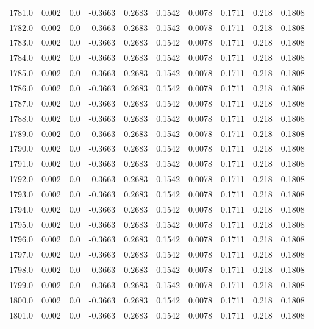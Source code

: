 \begin{longtable}{lrrrrrrrrr}
1781.0 & 0.002 & 0.0 & -0.3663 & 0.2683 & 0.1542 & 0.0078 & 0.1711 & 0.218 & 0.1808 \\
1782.0 & 0.002 & 0.0 & -0.3663 & 0.2683 & 0.1542 & 0.0078 & 0.1711 & 0.218 & 0.1808 \\
1783.0 & 0.002 & 0.0 & -0.3663 & 0.2683 & 0.1542 & 0.0078 & 0.1711 & 0.218 & 0.1808 \\
1784.0 & 0.002 & 0.0 & -0.3663 & 0.2683 & 0.1542 & 0.0078 & 0.1711 & 0.218 & 0.1808 \\
1785.0 & 0.002 & 0.0 & -0.3663 & 0.2683 & 0.1542 & 0.0078 & 0.1711 & 0.218 & 0.1808 \\
1786.0 & 0.002 & 0.0 & -0.3663 & 0.2683 & 0.1542 & 0.0078 & 0.1711 & 0.218 & 0.1808 \\
1787.0 & 0.002 & 0.0 & -0.3663 & 0.2683 & 0.1542 & 0.0078 & 0.1711 & 0.218 & 0.1808 \\
1788.0 & 0.002 & 0.0 & -0.3663 & 0.2683 & 0.1542 & 0.0078 & 0.1711 & 0.218 & 0.1808 \\
1789.0 & 0.002 & 0.0 & -0.3663 & 0.2683 & 0.1542 & 0.0078 & 0.1711 & 0.218 & 0.1808 \\
1790.0 & 0.002 & 0.0 & -0.3663 & 0.2683 & 0.1542 & 0.0078 & 0.1711 & 0.218 & 0.1808 \\
1791.0 & 0.002 & 0.0 & -0.3663 & 0.2683 & 0.1542 & 0.0078 & 0.1711 & 0.218 & 0.1808 \\
1792.0 & 0.002 & 0.0 & -0.3663 & 0.2683 & 0.1542 & 0.0078 & 0.1711 & 0.218 & 0.1808 \\
1793.0 & 0.002 & 0.0 & -0.3663 & 0.2683 & 0.1542 & 0.0078 & 0.1711 & 0.218 & 0.1808 \\
1794.0 & 0.002 & 0.0 & -0.3663 & 0.2683 & 0.1542 & 0.0078 & 0.1711 & 0.218 & 0.1808 \\
1795.0 & 0.002 & 0.0 & -0.3663 & 0.2683 & 0.1542 & 0.0078 & 0.1711 & 0.218 & 0.1808 \\
1796.0 & 0.002 & 0.0 & -0.3663 & 0.2683 & 0.1542 & 0.0078 & 0.1711 & 0.218 & 0.1808 \\
1797.0 & 0.002 & 0.0 & -0.3663 & 0.2683 & 0.1542 & 0.0078 & 0.1711 & 0.218 & 0.1808 \\
1798.0 & 0.002 & 0.0 & -0.3663 & 0.2683 & 0.1542 & 0.0078 & 0.1711 & 0.218 & 0.1808 \\
1799.0 & 0.002 & 0.0 & -0.3663 & 0.2683 & 0.1542 & 0.0078 & 0.1711 & 0.218 & 0.1808 \\
1800.0 & 0.002 & 0.0 & -0.3663 & 0.2683 & 0.1542 & 0.0078 & 0.1711 & 0.218 & 0.1808 \\
1801.0 & 0.002 & 0.0 & -0.3663 & 0.2683 & 0.1542 & 0.0078 & 0.1711 & 0.218 & 0.1808 \\

\end{longtable}
